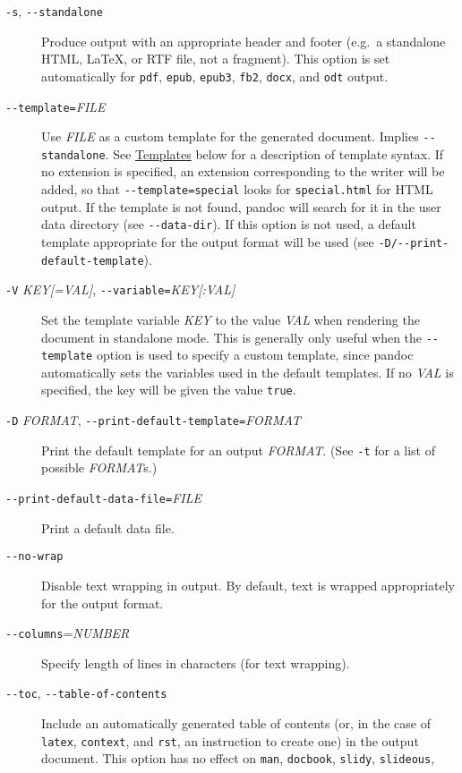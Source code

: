 \documentclass[]{article}
\begin{document}
\begin{description}
\item[\texttt{-s}, \texttt{-{}-standalone}]
Produce output with an appropriate header and footer (e.g.~a standalone
HTML, LaTeX, or RTF file, not a fragment). This option is set
automatically for \texttt{pdf}, \texttt{epub}, \texttt{epub3},
\texttt{fb2}, \texttt{docx}, and \texttt{odt} output.
\item[\texttt{-{}-template=}\emph{FILE}]
Use \emph{FILE} as a custom template for the generated document. Implies
\texttt{-{}-standalone}. See \hyperref[templates]{Templates} below for a
description of template syntax. If no extension is specified, an
extension corresponding to the writer will be added, so that
\texttt{-{}-template=special} looks for \texttt{special.html} for HTML
output. If the template is not found, pandoc will search for it in the
user data directory (see \texttt{-{}-data-dir}). If this option is not
used, a default template appropriate for the output format will be used
(see \texttt{-D/-{}-print-default-template}).
\item[\texttt{-V} \emph{KEY{[}=VAL{]}},
\texttt{-{}-variable=}\emph{KEY{[}:VAL{]}}]
Set the template variable \emph{KEY} to the value \emph{VAL} when
rendering the document in standalone mode. This is generally only useful
when the \texttt{-{}-template} option is used to specify a custom
template, since pandoc automatically sets the variables used in the
default templates. If no \emph{VAL} is specified, the key will be given
the value \texttt{true}.
\item[\texttt{-D} \emph{FORMAT},
\texttt{-{}-print-default-template=}\emph{FORMAT}]
Print the default template for an output \emph{FORMAT}. (See \texttt{-t}
for a list of possible \emph{FORMAT}s.)
\item[\texttt{-{}-print-default-data-file=}\emph{FILE}]
Print a default data file.
\item[\texttt{-{}-no-wrap}]
Disable text wrapping in output. By default, text is wrapped
appropriately for the output format.
\item[\texttt{-{}-columns}=\emph{NUMBER}]
Specify length of lines in characters (for text wrapping).
\item[\texttt{-{}-toc}, \texttt{-{}-table-of-contents}]
Include an automatically generated table of contents (or, in the case of
\texttt{latex}, \texttt{context}, and \texttt{rst}, an instruction to
create one) in the output document. This option has no effect on
\texttt{man}, \texttt{docbook}, \texttt{slidy}, \texttt{slideous},

\end{description}
\end{document}
